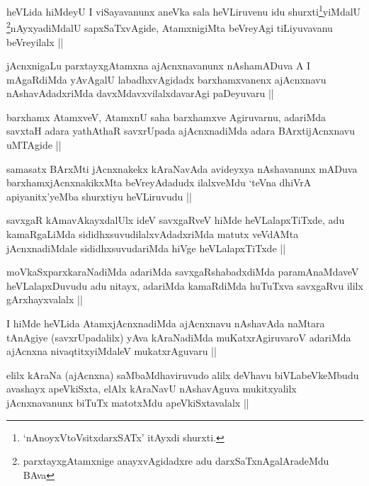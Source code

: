 \begin{artha}
heVLida hiMdeyU I viSayavanunx aneVka sala heVLiruvenu idu
shurxti\footnote{`nAnoyxVtoV\s sitxdarxSATx' itAyxdi
  shurxti.}yiMdalU \footnote{parxtayxgAtamxnige anayxvAgidadxre adu
  darxSaTxnAgalAradeMdu BAva}nAyxyadiMdalU sapxSaTxvAgide,
AtamxnigiMta beVreyAgi tiLiyuvavanu beVreyilalx ||
\end{artha}

\begin{artha}
jAcnxnigaLu parxtayxgAtamxna ajAcnxnavanunx nAshamADuva A I mAgaRdiMda
yAvAgalU labadhxvAgidadx barxhamxvanenx ajAcnxnavu nAshavAdadxriMda
davxMdavxvilalxdavarAgi paDeyuvaru ||
\end{artha}

\begin{artha}
barxhamx AtamxveV, AtamxnU saha barxhamxve Agiruvarnu, adariMda
savxtaH adara yathAthaR savxrUpada ajAcnxnadiMda adara BArxtijAcnxnavu
uMTAgide ||
\end{artha}

\begin{artha}
samasatx BArxMti jAcnxnakekx kAraNavAda avideyxya nAshavanunx mADuva
barxhamxjAcnxnakikxMta beVreyAdadudx ilalxveMdu `teVna dhiVrA
apiyanitx'yeMba shurxtiyu heVLiruvudu ||
\end{artha}


\begin{artha}
savxgaR kAmavAkayxdalUlx ideV savxgaRveV hiMde heVLalapxTiTxde, adu
kamaRgaLiMda sididhxsuvudilalxvAdadxriMda matutx veVdAMta
jAcnxnadiMdale sididhxsuvudariMda hiVge heVLalapxTiTxde ||
\end{artha}

\begin{artha}
moVkaSxparxkaraNadiMda adariMda savxgaRshabadxdiMda paramAnaMdaveV
heVLalapxDuvudu adu nitayx, adariMda kamaRdiMda huTuTxva savxgaRvu
ililx gArxhayxvalalx ||
\end{artha}


\begin{artha}
I hiMde heVLida AtamxjAcnxnadiMda ajAcnxnavu nAshavAda naMtara
tAnAgiye (savxrUpadalilx) yAva kAraNadiMda muKatxrAgiruvaroV adariMda
ajAcnxna nivaqtitxyiMdaleV mukatxrAguvaru ||
\end{artha}

\begin{artha}
elilx kAraNa (ajAcnxna) saMbaMdhaviruvudo alilx deVhavu
biVLabeVkeMbudu avashayx apeVkiSxta, elAlx kAraNavU nAshavAguva
mukitxyalilx jAcnxnavanunx biTuTx matotxMdu apeVkiSxtavalalx || 
\end{artha}

